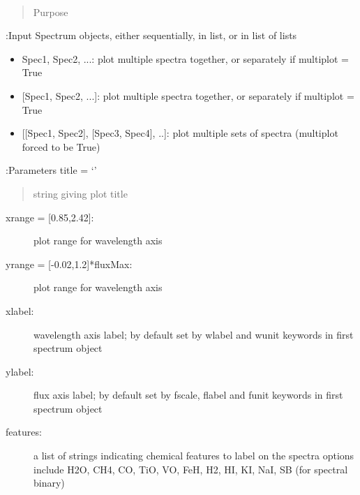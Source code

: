 \documentclass[letterpaper,10pt,english]{sphinxmanual}
\begin{document}
\begin{fulllineitems}
\label{splat_plot:splat.plotSpectrum}~\begin{quote}\begin{description}
\item[{Purpose}] \leavevmode
{}

\end{description}\end{quote}

:Input
Spectrum objects, either sequentially, in list, or in list of lists
\begin{itemize}
\item {} 
Spec1, Spec2, ...: plot multiple spectra together, or separately if multiplot = True

\item {} 
{[}Spec1, Spec2, ...{]}: plot multiple spectra together, or separately if multiplot = True

\item {} 
{[}{[}Spec1, Spec2{]}, {[}Spec3, Spec4{]}, ..{]}: plot multiple sets of spectra (multiplot forced to be True)

\end{itemize}

:Parameters
title = `'
\begin{quote}

string giving plot title
\end{quote}
\begin{description}
\item[{xrange = {[}0.85,2.42{]}:}] \leavevmode
plot range for wavelength axis

\item[{yrange = {[}-0.02,1.2{]}*fluxMax:}] \leavevmode
plot range for wavelength axis

\item[{xlabel:}] \leavevmode
wavelength axis label; by default set by wlabel and wunit keywords in first spectrum object

\item[{ylabel:}] \leavevmode
flux axis label; by default set by fscale, flabel and funit keywords in first spectrum object

\item[{features:}] \leavevmode
a list of strings indicating chemical features to label on the spectra
options include H2O, CH4, CO, TiO, VO, FeH, H2, HI, KI, NaI, SB (for spectral binary)


\end{description}
\end{fulllineitems}
\end{document}
